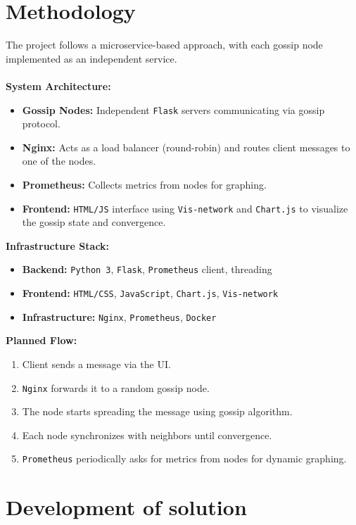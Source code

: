 \documentclass[a4paper,12pt]{article}
\begin{document}
\section{Methodology}

The project follows a microservice-based approach, with each gossip node implemented as an independent service.\\\\
\textbf{System Architecture:}
\begin{itemize}
    \item \textbf{Gossip Nodes:} Independent \verb|Flask| servers communicating via gossip protocol.
    \item \textbf{Nginx:} Acts as a load balancer (round-robin) and routes client messages to one of the nodes.
    \item \textbf{Prometheus:} Collects metrics from nodes for graphing.
    \item \textbf{Frontend:} \verb|HTML/JS| interface using \verb|Vis-network| and \verb|Chart.js| to visualize the gossip state and convergence.
\end{itemize}
\textbf{Infrastructure Stack:}
\begin{itemize}
    \item \textbf{Backend:} \verb|Python 3|, \verb|Flask|, \verb|Prometheus| client, threading
    \item \textbf{Frontend:} \verb|HTML/CSS|, \verb|JavaScript|, \verb|Chart.js|, \verb|Vis-network|
    \item \textbf{Infrastructure:} \verb|Nginx|, \verb|Prometheus|, \verb|Docker|
\end{itemize}
\textbf{Planned Flow:}
\begin{enumerate}
    \item Client sends a message via the UI.
    \item \verb|Nginx| forwards it to a random gossip node.
    \item The node starts spreading the message using gossip algorithm.
    \item Each node synchronizes with neighbors until convergence.
    \item \verb|Prometheus| periodically asks for metrics from nodes for dynamic graphing.
\end{enumerate}

\section{Development of solution}
\end{document}
